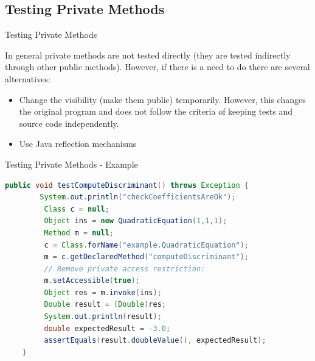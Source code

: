 \documentclass[11pt, xcolor=svgnames]{beamer}
\begin{document}
\subsection{Testing Private Methods}


\begin{frame}{Testing Private Methods}

In general private methods are not tested directly (they are tested indirectly through other public methods). However, if there is a need to do there are several alternatives:

\begin{itemize}
 \item Change the visibility (make them public) temporarily. However, this changes the original program and does not follow the criteria of keeping tests and source code independently.
 \item Use Java reflection mechanisms
\end{itemize}


\end{frame}



\begin{frame}[fragile]{Testing Private Methods - Example}

\begin{lstlisting}[language=Java,basicstyle=\tiny]
    public void testComputeDiscriminant() throws Exception {
        System.out.println("checkCoefficientsAreOk");
         Class c = null;
         Object ins = new QuadraticEquation(1,1,1);
         Method m = null;
         c = Class.forName("example.QuadraticEquation");
         m = c.getDeclaredMethod("computeDiscriminant");
         // Remove private access restriction:
         m.setAccessible(true);
         Object res = m.invoke(ins);
         Double result = (Double)res;
         System.out.println(result);
         double expectedResult = -3.0;
         assertEquals(result.doubleValue(), expectedResult);
    }
\end{lstlisting}

\end{frame}

\end{document}
